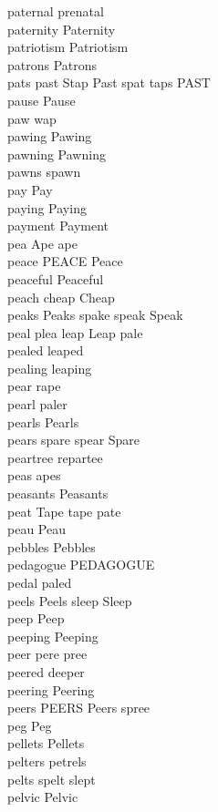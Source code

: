 paternal prenatal\\
paternity Paternity\\
patriotism Patriotism\\
patrons Patrons\\
pats past Stap Past spat taps PAST\\
pause Pause\\
paw wap\\
pawing Pawing\\
pawning Pawning\\
pawns spawn\\
pay Pay\\
paying Paying\\
payment Payment\\
pea Ape ape\\
peace PEACE Peace\\
peaceful Peaceful\\
peach cheap Cheap\\
peaks Peaks spake speak Speak\\
peal plea leap Leap pale\\
pealed leaped\\
pealing leaping\\
pear rape\\
pearl paler\\
pearls Pearls\\
pears spare spear Spare\\
peartree repartee\\
peas apes\\
peasants Peasants\\
peat Tape tape pate\\
peau Peau\\
pebbles Pebbles\\
pedagogue PEDAGOGUE\\
pedal paled\\
peels Peels sleep Sleep\\
peep Peep\\
peeping Peeping\\
peer pere pree\\
peered deeper\\
peering Peering\\
peers PEERS Peers spree\\
peg Peg\\
pellets Pellets\\
pelters petrels\\
pelts spelt slept\\
pelvic Pelvic\\
